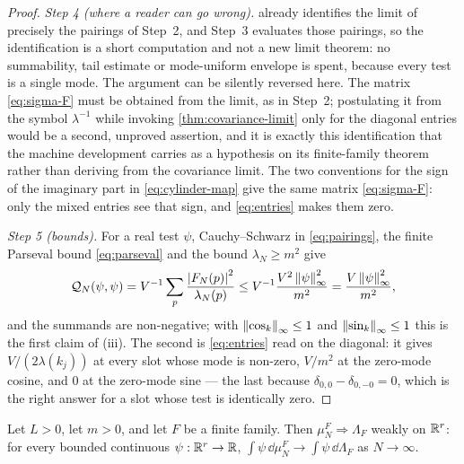 \begin{proof}
\emph{Step 4 (where a reader can go wrong).} 
already identifies the limit of precisely the pairings of Step~2, and Step~3
evaluates those pairings, so the identification is a short computation and not
a new limit theorem: no summability, tail estimate or mode-uniform envelope is
spent, because every test is a single mode. The argument can be silently
reversed here. The matrix \eqref{eq:sigma-F} must be obtained from the limit,
as in Step~2; postulating it from the symbol $\lambda^{-1}$ while invoking
\cref{thm:covariance-limit} only for the diagonal entries would be a second,
unproved assertion, and it is exactly this identification that the machine
development carries as a hypothesis on its finite-family theorem rather than
deriving from the covariance limit. The two conventions for the sign of the
imaginary part in \eqref{eq:cylinder-map} give the same matrix
\eqref{eq:sigma-F}: only the mixed entries see that sign, and
\eqref{eq:entries} makes them zero.

\emph{Step 5 (bounds).} For a real test $\psi$, Cauchy--Schwarz in
\eqref{eq:pairings}, the finite Parseval bound \eqref{eq:parseval} and the
bound $\lambda_N\ge m^{2}$ give
\[
  \mathcal Q_N(\psi,\psi)=V^{-1}\sum_{p}\frac{\left| F_N(p) \right|^{2}}{\lambda_N(p)}
  \le V^{-1}\frac{V^{2}\left\| \psi \right\|_\infty^{2}}{m^{2}}
  =\frac{V\left\| \psi \right\|_\infty^{2}}{m^{2}},
\]
and the summands are non-negative; with $\left\| \cos_k \right\|_\infty\le1$ and
$\left\| \sin_k \right\|_\infty\le1$ this is the first claim of (iii). The second is
\eqref{eq:entries} read on the diagonal: it gives $V/(2\lambda(k_j))$ at every
slot whose mode is non-zero, $V/m^{2}$ at the zero-mode cosine, and $0$ at the
zero-mode sine --- the last because $\delta_{0,0}-\delta_{0,-0}=0$, which is the
right answer for a slot whose test is identically zero.
\end{proof}

\begin{theorem}\label{thm:finite-family}
Let $L>0$, let $m>0$, and let $F$ be a finite family. Then
$\mu_N^F\Rightarrow\Lambda_F$ weakly on $\mathbb{R}^r$: for every bounded continuous
$\psi:\mathbb{R}^r\to\mathbb{R}$, $\int\psi\,\dd\mu_N^F\to\int\psi\,\dd\Lambda_F$ as
$N\to\infty$.
\end{theorem}

